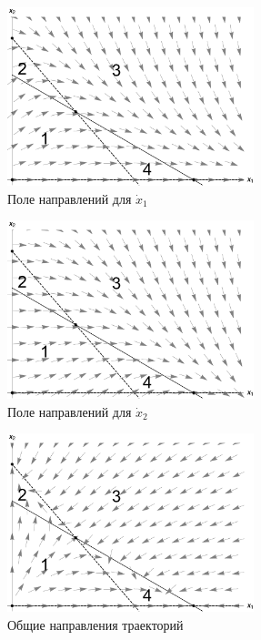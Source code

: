 \documentclass[12pt,a4paper]{article}
\begin{document}
    \begin{figure}[h]
        \centering
        \includegraphics[width=0.64\textwidth]{dirFields_21.pdf}
        \caption{Поле направлений для $ \dot x_1 $}
        \label{fig:dirFields_21}
    \end{figure}

    \pagebreak

    \begin{figure}[h]
        \centering
        \includegraphics[width=0.64\textwidth]{dirFields_22.pdf}
        \caption{Поле направлений для $ \dot x_2 $}
        \label{fig:dirFields_22}
    \end{figure}
    
    \begin{figure}[h]
        \centering
        \includegraphics[width=0.64\textwidth]{areas_2.pdf}
        \caption{Общие направления траекторий}
        \label{fig:areas_2}
    \end{figure}
\end{document}
